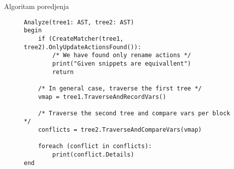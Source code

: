 \begin{frame}[fragile]{Algoritam poredjenja}
\begin{figure}[!h]
\centering
\begin{lstlisting}[basicstyle=\tiny\ttfamily]
Analyze(tree1: AST, tree2: AST)
begin
    if (CreateMatcher(tree1, tree2).OnlyUpdateActionsFound()):
        /* We have found only rename actions */
        print("Given snippets are equivallent")
        return

    /* In general case, traverse the first tree */
    vmap = tree1.TraverseAndRecordVars()

    /* Traverse the second tree and compare vars per block */
    conflicts = tree2.TraverseAndCompareVars(vmap)

    foreach (conflict in conflicts):
        print(conflict.Details)
end
\end{lstlisting}
\end{figure}
\end{frame}
